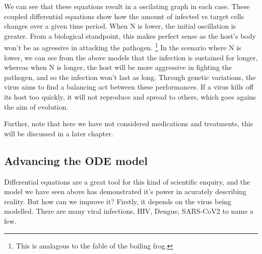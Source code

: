 We can see that these equations result in a oscilating graph in each case. These coupled differential equations show how the amount of infected vs target cells changes over a given time period. When N is lower, the initial oscillation is greater. From a biological standpoint, this makes perfect sense as the host's body won't be as agressive in attacking the pathogen. \footnote{This is analagous to the fable of the boiling frog.} In the scenario where N is lower, we can see from the above models that the infection is sustained for longer, whereas when N is longer, the host will be more aggressive in fighting the pathogen, and so the infection won't last as long. Through genetic variations, the virus aims to find a balancing act between these performances. If a virus kills off its host too quickly, it will not reproduce and spread to others, which goes agains the aim of evolution.

Further, note that here we have not considered medications and treatments, this will be discussed in a later chapter.

\subsection{Advancing the ODE model}

Differential equations are a great tool for this kind of scientific enquiry, and the model we have seen above has demonstrated it's power in acurately describing reality. But how can we improve it? Firstly, it depends on the virus being modelled. There are many viral infections, HIV, Dengue, SARS-CoV2 to name a few. 


{}


